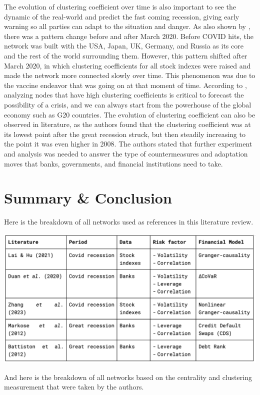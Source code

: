 \documentclass[a4paper,11pt]{article}
\begin{document}
The evolution of clustering coefficient over time is also important to see the dynamic of the real-world and predict the fast coming recession, giving early warning so all parties can adapt to the situation and danger. As also shown by \cite{Lai_Hu_2021}, there was a pattern change before and after March 2020. Before COVID hits, the network was built with the USA, Japan, UK, Germany, and Russia as its core and the rest of the world surrounding them. However, this pattern shifted after March 2020, in which clustering coefficients for all stock indexes were raised and made the network more connected slowly over time. This phenomenon was due to the vaccine endeavor that was going on at that moment of time. According to \cite{Lai_Hu_2021}, analyzing nodes that have high clustering coefficients is critical to forecast the possibility of a crisis, and we can always start from the powerhouse of the global economy such as G20 countries. The evolution of clustering coefficient can also be observed in \cite{Markose_Giansante_Shaghaghi_2012} literature, as the authors found that the clustering coefficient was at its lowest point after the great recession struck, but then steadily increasing to the point it was even higher in 2008. The authors stated that further experiment and analysis was needed to answer the type of countermeasures and adaptation moves that banks, governments, and financial institutions need to take.

\section{Summary \& Conclusion}
Here is the breakdown of all networks used as references in this literature review.

\includegraphics[scale=0.5]{comparison_1.png}

And here is the breakdown of all networks based on the centrality and clustering measurement that were taken by the authors.
\end{document}
